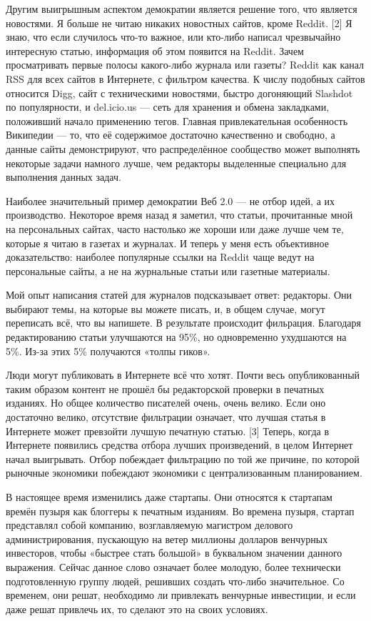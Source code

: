 \documentclass[ebook,12pt,oneside,openany]{memoir}
\begin{document}
Другим выигрышным аспектом демократии является решение того, что
является новостями. Я больше не читаю никаких новостных сайтов, кроме
Reddit. [2] Я знаю, что если случилось что-то важное, или кто-либо
написал чрезвычайно интересную статью, информация об этом появится на
Reddit. Зачем просматривать первые полосы какого-либо журнала или
газеты? Reddit как канал RSS для всех сайтов в Интернете, с фильтром
качества. К числу подобных сайтов относится Digg, сайт с техническими
новостями, быстро догоняющий Slashdot по популярности, и del.icio.us —
сеть для хранения и обмена закладками, положивший начало применению
тегов. Главная привлекательная особенность Википедии — то, что её
содержимое достаточно качественно и свободно, а данные сайты
демонстрируют, что распределённое сообщество может выполнять некоторые
задачи намного лучше, чем редакторы выделенные специально для
выполнения данных задач.

Наиболее значительный пример демократии Веб 2.0 — не отбор идей, а их
производство. Некоторое время назад я заметил, что статьи, прочитанные
мной на персональных сайтах, часто настолько же хороши или даже лучше
чем те, которые я читаю в газетах и журналах. И теперь у меня есть
объективное доказательство: наиболее популярные ссылки на Reddit чаще
ведут на персональные сайты, а не на журнальные статьи или газетные
материалы.

Мой опыт написания статей для журналов подсказывает ответ: редакторы.
Они выбирают темы, на которые вы можете писать, и, в общем случае,
могут переписать всё, что вы напишете. В результате происходит
фильрация. Благодаря редактированию статьи улучшаются на 95\%, но
одновременно ухудшаются на 5\%. Из-за этих 5\% получаются «толпы
гиков».

Люди могут публиковать в Интернете всё что хотят. Почти весь
опубликованный таким образом контент не прошёл бы редакторской
проверки в печатных изданиях. Но общее количество писателей очень,
очень велико. Если оно достаточно велико, отсутствие фильтрации
означает, что лучшая статья в Интернете может превзойти лучшую
печатную статью. [3] Теперь, когда в Интернете появились средства
отбора лучших произведений, в целом Интернет начал выигрывать. Отбор
побеждает фильтрацию по той же причине, по которой рыночные экономики
побеждают экономики с централизованным планированием.

В настоящее время изменились даже стартапы. Они относятся к стартапам
времён пузыря как блоггеры к печатным изданиям. Во времена пузыря,
стартап представлял собой компанию, возглавляемую магистром делового
администрирования, пускающую на ветер миллионы долларов венчурных
инвесторов, чтобы «быстрее стать большой» в буквальном значении
данного выражения. Сейчас данное слово означает более молодую, более
технически подготовленную группу людей, решивших создать что-либо
значительное. Со временем, они решат, необходимо ли привлекать
венчурные инвестиции, и если даже решат привлечь их, то сделают это на
своих условиях.
\end{document}

